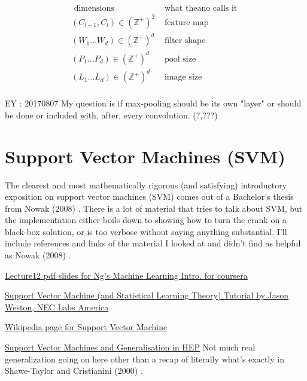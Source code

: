 \documentclass[10pt]{amsart}
\begin{document}
\begin{multicols*}{2}
\begin{equation}
\begin{aligned}
\text{ dimensions } & \text{ what theano calls it } \\ 
(C_{l-1}, C_l) \in (\mathbb{Z}^+)^2 & \text{ feature map } \\ 
(W_1 \dots W_d) \in (\mathbb{Z}^+)^d & \text{ filter shape }  \\
(P_1 \dots P_d) \in (\mathbb{Z}^+)^d & \text{ pool size  }  \\ 
(L_1 \dots L_d) \in (\mathbb{Z}^+)^d & \text{ image size }  \\
\end{aligned}
\end{equation}

EY : 20170807 My question is if max-pooling should be its own "layer" or should be done or included with, after, every convolution.  (?,???)

\part{Support Vector Machines (SVM)}

The clearest and most mathematically rigorous (and satisfying) introductory exposition on support vector machines (SVM) comes out of a Bachelor's thesis from Nowak (2008) \cite{Nowa2008}.  There is a lot of material that tries to talk about SVM, but the implementation either boils down to showing how to turn the crank on a black-box solution, or is too verbose without saying anything substantial.  I'll include references and links of the material I looked at and didn't find as helpful as Nowak (2008) \cite{Nowa2008}.  

\href{https://d18ky98rnyall9.cloudfront.net/_246c2a4e4c249f94c895f607ea1e6407_Lecture12.pdf?Expires=1490227200&Signature=VxrCShNSKNcYN9~2eHC~IQoQv11wIyqVGEMWVtaycFoimayg-XnGkJaBR4s~aIGf3nq~ck-W5ow4WM0-3vLuxfSkmhQflZH4Bx5fVo2w3R~bldnsJc91Bq-w27KZTw-Xanct~Cn7RnT0ViPlGYeUBmmrSoXAer5IZyPVdmbChzY_&Key-Pair-Id=APKAJLTNE6QMUY6HBC5A}{Lecture12 pdf slides for Ng's Machine Learning Intro. for coursera}

\href{http://www.cs.columbia.edu/~kathy/cs4701/documents/jason_svm_tutorial.pdf}{Support Vector Machine
(and Statistical Learning Theory) Tutorial by Jason Weston, NEC Labs America}

\href{https://en.wikipedia.org/wiki/Support_vector_machine}{Wikipedia page for Support Vector Machine}

\href{https://arxiv.org/pdf/1610.09932.pdf}{Support Vector Machines and Generalisation in HEP} Not much real generalization going on here other than a recap of literally what's exactly in Shawe-Taylor and Cristianini (2000) \cite{STCr2000}.  


\end{multicols*}
\end{document}
